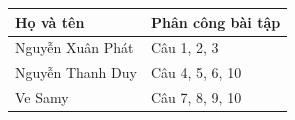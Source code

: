 \documentclass[11pt, a4paper, fleqn]{article}
\begin{document}
\begin{center}
\begin{tabular}{|>{\centering\arraybackslash}p{5cm}|>{\centering\arraybackslash}p{9cm}|}
\hline
\textbf{Họ và tên} & \textbf{Phân công bài tập} \\ 
\hline
Nguyễn Xuân Phát & Câu 1, 2, 3 \\ 
\hline
Nguyễn Thanh Duy & Câu 4, 5, 6, 10 \\ 
\hline
Ve Samy & Câu 7, 8, 9, 10 \\ 
\hline
\end{tabular}
\end{center}















\end{document}
